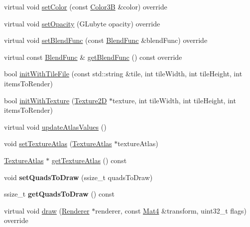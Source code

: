\begin{DoxyCompactItemize}
\item 
virtual void \hyperlink{classAtlasNode_a67a26fd695101fe4efa0533cb3dc9f39}{set\+Color} (const \hyperlink{structColor3B}{Color3B} \&color) override
\item 
virtual void \hyperlink{classAtlasNode_a396e36e894a70722806e90c7101207bc}{set\+Opacity} (G\+Lubyte opacity) override
\item 
virtual void \hyperlink{classAtlasNode_ad6f8b156ff845f7ffd08179e3a5af035}{set\+Blend\+Func} (const \hyperlink{structBlendFunc}{Blend\+Func} \&blend\+Func) override
\item 
virtual const \hyperlink{structBlendFunc}{Blend\+Func} \& \hyperlink{classAtlasNode_a17f6efbcb86fa6e83df4213d23777977}{get\+Blend\+Func} () const override
\item 
bool \hyperlink{classAtlasNode_a70804bf430d042bb94a6e2b18c47d7f2}{init\+With\+Tile\+File} (const std\+::string \&tile, int tile\+Width, int tile\+Height, int items\+To\+Render)
\item 
bool \hyperlink{classAtlasNode_a2d9f1166a53720d7ac48ab665c847604}{init\+With\+Texture} (\hyperlink{classTexture2D}{Texture2D} $\ast$texture, int tile\+Width, int tile\+Height, int items\+To\+Render)
\item 
virtual void \hyperlink{classAtlasNode_a89a11eaf03df2a45123470c3ac87be22}{update\+Atlas\+Values} ()
\item 
void \hyperlink{classAtlasNode_ae008de73e7b0be719b73b57a94722894}{set\+Texture\+Atlas} (\hyperlink{classTextureAtlas}{Texture\+Atlas} $\ast$texture\+Atlas)
\item 
\hyperlink{classTextureAtlas}{Texture\+Atlas} $\ast$ \hyperlink{classAtlasNode_ab383df8fe17243d03f86d47296d3bd33}{get\+Texture\+Atlas} () const
\item 
\mbox{\label{classAtlasNode_a75735e107d32bdd019216b8b3a706467}} 
void {\bfseries set\+Quads\+To\+Draw} (ssize\+\_\+t quads\+To\+Draw)
\item 
\mbox{\label{classAtlasNode_a5fd045ec7e53606e5f58947359a3c332}} 
ssize\+\_\+t {\bfseries get\+Quads\+To\+Draw} () const
\item 
virtual void \hyperlink{classAtlasNode_af4fb010941d0fd8d26c14a5c524a6b55}{draw} (\hyperlink{classRenderer}{Renderer} $\ast$renderer, const \hyperlink{classMat4}{Mat4} \&transform, uint32\+\_\+t flags) override
\item 
\mbox{\label{classAtlasNode_afc7c3ce1e161d8379234dd316ddd5806}} 

\end{DoxyCompactItemize}
